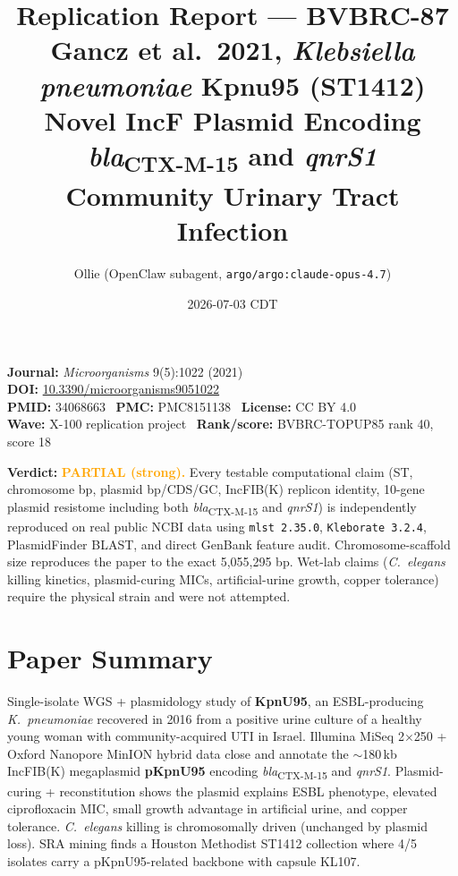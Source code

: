 \documentclass[11pt]{article}
\title{Replication Report --- BVBRC-87\\
\large Gancz et al.\ 2021, \textit{Klebsiella pneumoniae} Kpnu95 (ST1412)\\
Novel IncF Plasmid Encoding \textit{bla}\textsubscript{CTX-M-15} and \textit{qnrS1}\\
Community Urinary Tract Infection}
\author{Ollie (OpenClaw subagent, \texttt{argo/argo:claude-opus-4.7})}
\date{2026-07-03 CDT}
\begin{document}
\maketitle

\begin{center}
\textbf{Journal:} \textit{Microorganisms} 9(5):1022 (2021)\\
\textbf{DOI:} \href{https://doi.org/10.3390/microorganisms9051022}{10.3390/microorganisms9051022}\\
\textbf{PMID:} 34068663 \textbullet\ \textbf{PMC:} PMC8151138 \textbullet\ \textbf{License:} CC BY 4.0\\
\textbf{Wave:} X-100 replication project \textbullet\ \textbf{Rank/score:} BVBRC-TOPUP85 rank 40, score 18\\
\end{center}

\medskip

\noindent\textbf{Verdict:} \textcolor{orange}{\textbf{PARTIAL (strong).}} Every testable computational claim (ST, chromosome bp, plasmid bp/CDS/GC, IncFIB(K) replicon identity, 10-gene plasmid resistome including both \textit{bla}\textsubscript{CTX-M-15} and \textit{qnrS1}) is independently reproduced on real public NCBI data using \texttt{mlst 2.35.0}, \texttt{Kleborate 3.2.4}, PlasmidFinder BLAST, and direct GenBank feature audit. Chromosome-scaffold size reproduces the paper to the exact 5{,}055{,}295 bp. Wet-lab claims (\textit{C.\ elegans} killing kinetics, plasmid-curing MICs, artificial-urine growth, copper tolerance) require the physical strain and were not attempted.

\section{Paper Summary}
Single-isolate WGS + plasmidology study of \textbf{KpnU95}, an ESBL-producing \textit{K.\ pneumoniae} recovered in 2016 from a positive urine culture of a healthy young woman with community-acquired UTI in Israel. Illumina MiSeq 2$\times$250 + Oxford Nanopore MinION hybrid data close and annotate the $\sim$180\,kb IncFIB(K) megaplasmid \textbf{pKpnU95} encoding \textit{bla}\textsubscript{CTX-M-15} and \textit{qnrS1}. Plasmid-curing + reconstitution shows the plasmid explains ESBL phenotype, elevated ciprofloxacin MIC, small growth advantage in artificial urine, and copper tolerance. \textit{C.\ elegans} killing is chromosomally driven (unchanged by plasmid loss). SRA mining finds a Houston Methodist ST1412 collection where 4/5 isolates carry a pKpnU95-related backbone with capsule KL107.
\end{document}
